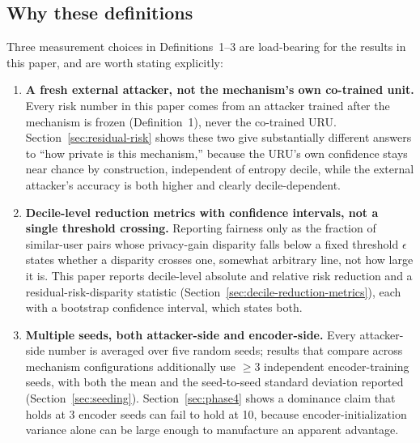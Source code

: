 \subsection{Why these definitions}
\label{sec:methods-changed}
Three measurement choices in Definitions~1--3 are load-bearing for the
results in this paper, and are worth stating explicitly:
\begin{enumerate}
\item \textbf{A fresh external attacker, not the mechanism's own
  co-trained unit.} Every risk number in this paper comes from an
  attacker trained after the mechanism is frozen (Definition~1), never
  the co-trained URU. Section~\ref{sec:residual-risk} shows these two
  give substantially different answers to ``how private is this
  mechanism,'' because the URU's own confidence stays near chance by
  construction, independent of entropy decile, while the external
  attacker's accuracy is both higher and clearly decile-dependent.
\item \textbf{Decile-level reduction metrics with confidence intervals,
  not a single threshold crossing.} Reporting fairness only as the
  fraction of similar-user pairs whose privacy-gain disparity falls
  below a fixed threshold $\epsilon$ states whether a disparity crosses
  one, somewhat arbitrary line, not how large it is. This paper reports
  decile-level absolute and relative risk reduction and a
  residual-risk-disparity statistic (Section~\ref{sec:decile-reduction-metrics}),
  each with a bootstrap confidence interval, which states both.
\item \textbf{Multiple seeds, both attacker-side and encoder-side.}
  Every attacker-side number is averaged over five random seeds;
  results that compare across mechanism configurations additionally use
  $\geq 3$ independent encoder-training seeds, with both the mean and
  the seed-to-seed standard deviation reported (Section~\ref{sec:seeding}).
  Section~\ref{sec:phase4} shows a dominance claim that holds at 3
  encoder seeds can fail to hold at 10, because encoder-initialization
  variance alone can be large enough to manufacture an apparent
  advantage.
\end{enumerate}

